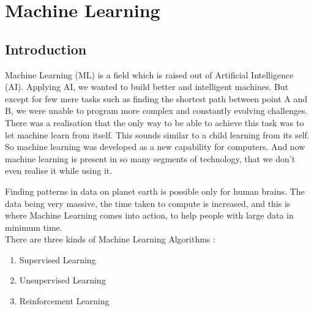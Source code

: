 \documentclass{report}
\begin{document}
\chapter {Machine Learning}

\section{Introduction}
Machine Learning (ML) is a field which is raised out of Artificial Intelligence (AI). Applying AI, we wanted to build better and intelligent
machines. But except for few mere tasks such as finding the shortest path between point A and B, we were unable to program more complex
and constantly evolving challenges. There was a realisation that the only way to be able to achieve this task was to let machine learn
from itself. This sounds similar to a child learning from its self. So machine learning was developed as a new capability for computers.
And now machine learning is present in so many segments of technology, that we don’t even realise it while using it. \par
Finding patterns in data on planet earth is possible only for human brains. The data being very massive, the time taken to compute is
increased, and this is where Machine Learning comes into action, to help people with large data in minimum time. \\
There are three kinds of Machine Learning Algorithms :
 
\begin{enumerate}
\item Supervised Learning
\item Unsupervised Learning
\item Reinforcement Learning
\end{enumerate}
\end{document}
